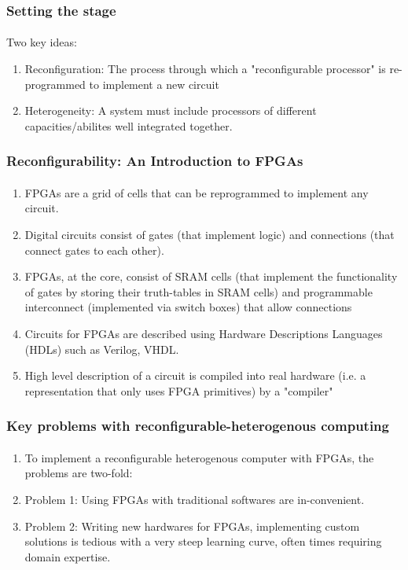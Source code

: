 \documentclass{beamer}
\begin{document}
\begin{frame}[fragile]
  \frametitle{Setting the stage}
  \framesubtitle{}
    Two key ideas:
      \begin{enumerate}
        \item Reconfiguration: The process through which a "reconfigurable
      processor" is re-programmed to implement a new circuit
        \item Heterogeneity: A system must include processors of different 
          capacities/abilites well integrated together.
      \end{enumerate}
\end{frame}

\begin{frame}[fragile]
\frametitle{Reconfigurability: An Introduction to FPGAs}
\framesubtitle{}
  \begin{enumerate}
    \item FPGAs are a grid of cells that can be reprogrammed to implement
      any circuit. 
    \item Digital circuits consist of gates (that implement logic) and
      connections (that connect gates to each other).
    \item FPGAs, at the core, consist of SRAM cells (that implement the
      functionality of gates by storing their truth-tables in SRAM cells) and
      programmable interconnect (implemented via switch boxes) that allow
      connections
    \item Circuits for FPGAs are described using Hardware Descriptions Languages
      (HDLs) such as Verilog, VHDL.
    \item High level description of a circuit is compiled into real hardware
      (i.e. a representation that only uses FPGA primitives) by a "compiler"
  \end{enumerate}

\end{frame}

\begin{frame}[fragile]
\frametitle{Key problems with reconfigurable-heterogenous computing}
\framesubtitle{}
  \begin{enumerate}
    \item To implement a reconfigurable heterogenous computer with FPGAs,
      the problems are two-fold:
    \item Problem 1: Using FPGAs with traditional softwares are in-convenient.
    \item Problem 2: Writing new hardwares for FPGAs, implementing custom solutions is
      tedious with a very steep learning curve, often times requiring 
      domain expertise.
  \end{enumerate}
\end{frame}
\end{document}
